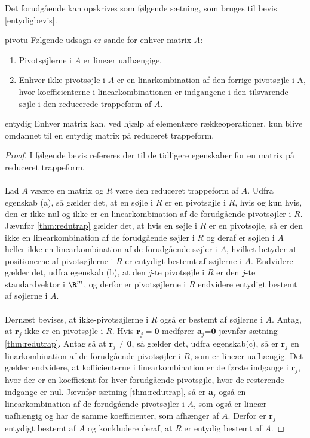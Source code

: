 Det forudgående kan opskrives som følgende sætning, som bruges til bevis \ref{entydigbevis}.

\begin{thm}{}{pivotu}
Følgende udsagn er sande for enhver matrix $A$: 
\begin{enumerate}[label=(\alph*)]
\item Pivotsøjlerne i $A$ er lineær uafhængige. 
\item Enhver ikke-pivotsøjle i $A$ er en linarkombination af den forrige pivotsøjle i A, hvor koefficienterne i linearkombinationen er indgangene i den tilsvarende søjle i den reducerede trappeform af $A$. 
\end{enumerate} 
\end{thm}

\begin{thm}{}{entydig}
Enhver matrix kan, ved hjælp af elementære rækkeoperationer, kun blive omdannet til en entydig matrix på reduceret trappeform.
\end{thm}
%
\begin{proof}\label{entydigbevis}
I følgende bevis refereres der til de tidligere egenskaber for en matrix på reduceret trappeform. \\\\
Lad $A$ væære en matrix og $R$ være den reduceret trappeform af $A$. Udfra egenskab (a), så gælder det, at en søjle i $R$ er en pivotsøjle i $R$, hvis og kun hvis, den er ikke-nul og ikke er en linearkombination af de forudgående pivotsøjler i $R$. Jævnfør \ref{thm:redutrap} gælder det, at hvis en søjle i $R$ er en pivotsøjle, så er den ikke en linearkombination af de forudgående søjler i $R$ og deraf er søjlen i $A$ heller ikke en linearkombination af de forudgående  søjler i $A$, hvilket betyder at positionerne af pivotsøjlerne i $R$ er entydigt bestemt af søjlerne i $A$. Endvidere gælder det, udfra egenskab (b), at den $j$-te pivotsøjle i $R$ er den $j$-te standardvektor i $\R^m$, og derfor er pivotsøjlerne i $R$ endvidere entydigt bestemt af søjlerne i $A$. \\\\
Dernæst bevises, at ikke-pivotsøjlerne i $R$ også er bestemt af søjlerne i $A$. Antag, at $\textbf{r}_j$ ikke er en pivotsøjle i $R$. Hvis $\textbf{r}_j=\textbf{0}$ medfører $\textbf{a}_j$=$\textbf{0}$ jævnfør sætning \ref{thm:redutrap}. Antag så at $\textbf{r}_j \neq \textbf{0}$, så gælder det, udfra egenskab(c), så er $\textbf{r}_j$ en linarkombination af de forudgående pivotsøjler i $R$, som er lineær uafhængig. Det gælder endvidere, at kofficienterne i linearkombination er de første indgange i $\textbf{r}_j$, hvor der er en koefficient for hver forudgående pivotsøjle, hvor de resterende indgange er nul. Jævnfør sætning \ref{thm:redutrap}, så er $\textbf{a}_j$ også en linearkombination af de forudgående pivotsøjler i $A$, som også er lineær uafhængig og har de samme koefficienter, som afhænger af $A$. Derfor er $\textbf{r}_j$ entydigt bestemt af $A$ og konkludere deraf, at $R$ er entydig bestemt af $A$. 
\end{proof}
